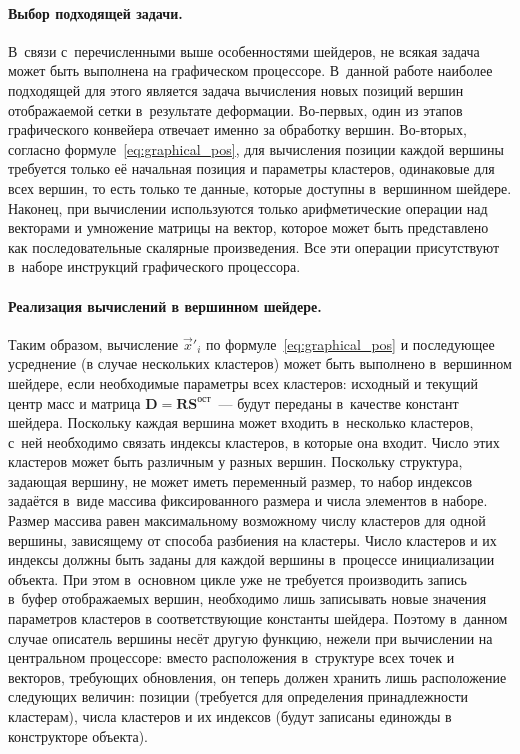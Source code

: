 \documentclass[a4paper, 14pt, titlepage]{extarticle}
\newcommand{\vect}[1]{\vec{#1}} %
\newcommand{\matx}[1]{\mathbf{#1}} %
\begin{document}
        \paragraph{Выбор подходящей задачи.}
        В~связи с~перечисленными выше особенностями шейдеров, не всякая задача может быть выполнена
        на графическом процессоре. В~данной работе наиболее подходящей для этого является задача
        вычисления новых позиций вершин отображаемой сетки в~результате деформации. Во-первых, один
        из этапов графического конвейера отвечает именно за обработку вершин. Во-вторых, согласно
        формуле~\eqref{eq:graphical_pos}, для вычисления позиции каждой вершины требуется только её
        начальная позиция и параметры кластеров, одинаковые для всех вершин, то есть только те
        данные, которые доступны в~вершинном шейдере. Наконец, при вычислении используются только
        арифметические операции над векторами и умножение матрицы на вектор, которое может быть
        представлено как последовательные скалярные произведения. Все эти операции присутствуют
        в~наборе инструкций графического процессора.

        \paragraph{Реализация вычислений в вершинном шейдере.}
        Таким образом, вычисление $\vect{x}'_i$ по формуле~\eqref{eq:graphical_pos} и последующее
        усреднение (в случае нескольких кластеров) может быть выполнено в~вершинном шейдере, если
        необходимые параметры всех кластеров: исходный и текущий центр масс и матрица $\matx D =
        \matx{R} \matx{S}^{ост}$~--- будут переданы в~качестве констант шейдера. Поскольку каждая
        вершина может входить в~несколько кластеров, с~ней необходимо связать индексы кластеров, в
        которые она входит. Число этих кластеров может быть различным у разных вершин. Поскольку
        структура, задающая вершину, не может иметь переменный размер, то набор индексов задаётся
        в~виде массива фиксированного размера и числа элементов в наборе. Размер массива равен
        максимальному возможному числу кластеров для одной вершины, зависящему от способа разбиения
        на кластеры. Число кластеров и их индексы должны быть заданы для каждой вершины в~процессе
        инициализации объекта. При этом в~основном цикле уже не требуется
        производить запись в~буфер отображаемых вершин, необходимо лишь записывать новые значения
        параметров кластеров в соответствующие константы шейдера. Поэтому в~данном случае описатель
        вершины несёт другую функцию, нежели при вычислении на центральном процессоре: вместо
        расположения в~структуре всех точек и векторов, требующих обновления, он теперь должен
        хранить лишь расположение следующих величин: позиции (требуется для определения
        принадлежности кластерам), числа кластеров и их индексов (будут записаны единожды в
        конструкторе объекта).
\end{document}
